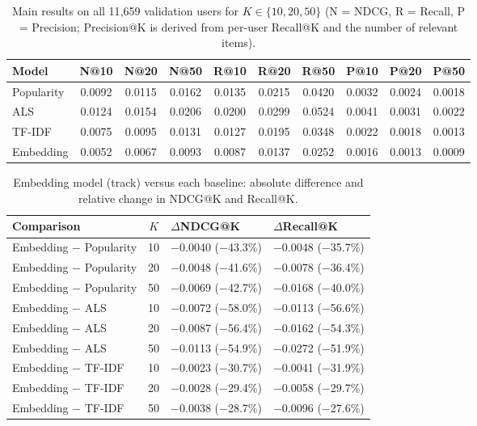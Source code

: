 \begin{table}[t]
\caption{Main results on all 11{,}659 validation users for $K\in\{10,20,50\}$ (N = NDCG, R = Recall, P = Precision; Precision@K is derived from per-user Recall@K and the number of relevant items).}
\label{tab:k}
\small
\begin{tabular}{lccccccccc}
\toprule
Model & N@10 & N@20 & N@50 & R@10 & R@20 & R@50 & P@10 & P@20 & P@50 \\
\midrule
Popularity & 0.0092 & 0.0115 & 0.0162 & 0.0135 & 0.0215 & 0.0420 & 0.0032 & 0.0024 & 0.0018 \\
ALS & 0.0124 & 0.0154 & 0.0206 & 0.0200 & 0.0299 & 0.0524 & 0.0041 & 0.0031 & 0.0022 \\
TF-IDF & 0.0075 & 0.0095 & 0.0131 & 0.0127 & 0.0195 & 0.0348 & 0.0022 & 0.0018 & 0.0013 \\
Embedding & 0.0052 & 0.0067 & 0.0093 & 0.0087 & 0.0137 & 0.0252 & 0.0016 & 0.0013 & 0.0009 \\
\bottomrule
\end{tabular}
\end{table}

\begin{table}[t]
\caption{Embedding model (track) versus each baseline: absolute difference and relative change in NDCG@K and Recall@K.}
\label{tab:track}
\small
\begin{tabular}{lcll}
\toprule
Comparison & $K$ & $\Delta$NDCG@K & $\Delta$Recall@K \\
\midrule
Embedding $-$ Popularity & 10 & $-$0.0040 ($-$43.3\%) & $-$0.0048 ($-$35.7\%) \\
Embedding $-$ Popularity & 20 & $-$0.0048 ($-$41.6\%) & $-$0.0078 ($-$36.4\%) \\
Embedding $-$ Popularity & 50 & $-$0.0069 ($-$42.7\%) & $-$0.0168 ($-$40.0\%) \\
Embedding $-$ ALS & 10 & $-$0.0072 ($-$58.0\%) & $-$0.0113 ($-$56.6\%) \\
Embedding $-$ ALS & 20 & $-$0.0087 ($-$56.4\%) & $-$0.0162 ($-$54.3\%) \\
Embedding $-$ ALS & 50 & $-$0.0113 ($-$54.9\%) & $-$0.0272 ($-$51.9\%) \\
Embedding $-$ TF-IDF & 10 & $-$0.0023 ($-$30.7\%) & $-$0.0041 ($-$31.9\%) \\
Embedding $-$ TF-IDF & 20 & $-$0.0028 ($-$29.4\%) & $-$0.0058 ($-$29.7\%) \\
Embedding $-$ TF-IDF & 50 & $-$0.0038 ($-$28.7\%) & $-$0.0096 ($-$27.6\%) \\
\bottomrule
\end{tabular}
\end{table}

